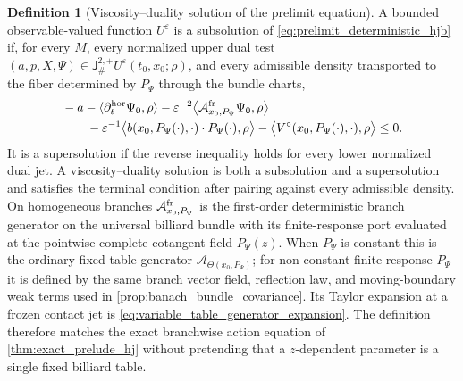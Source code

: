 \documentclass[12pt, letterpaper]{amsart}
\newcommand{\Acal}{\mathcal{A}}
\newcommand{\Hor}{\mathrm{hor}}
\newcommand{\Jet}{\mathsf{J}}
\theoremstyle{plain}
\theoremstyle{definition}
\newtheorem{definition}[theorem]{Definition}
\theoremstyle{remark}
\begin{document}
\begin{definition}[Viscosity--duality solution of the prelimit equation]
\label{def:viscosity_duality_solution}
A bounded observable-valued function $U^\varepsilon$ is a subsolution of
\eqref{eq:prelimit_deterministic_hjb} if, for every $M$, every normalized upper
dual test $(a,p,X,\Psi)\in\Jet^{2,+}_\#U^\varepsilon(t_0,x_0;\rho)$, and every
admissible density transported to the fiber determined by
$P_\Psi$ through the bundle charts,
\begin{equation}
\label{eq:viscodual_subsolution}
\begin{split}
    &-a-\langle\partial_t^{\Hor}\Psi_0,\rho\rangle
    -\varepsilon^{-2}\big\langle
        \Acal^{\rm fr}_{x_0,P_\Psi}\Psi_0,\rho\big\rangle\\
    &\qquad
    -\varepsilon^{-1}\big\langle
        b(x_0,P_\Psi(\cdot),\cdot)\cdot P_\Psi(\cdot),\rho\big\rangle
    -\big\langle V^\circ(x_0,P_\Psi(\cdot),\cdot),\rho\big\rangle\le0.
\end{split}
\end{equation}
It is a supersolution if the reverse inequality holds for every lower normalized
dual jet.  A viscosity--duality solution is both a subsolution and a
supersolution and satisfies the terminal condition after pairing against every
admissible density.  On homogeneous branches
$\Acal^{\rm fr}_{x_0,P_\Psi}$ is the first-order deterministic branch generator
on the universal billiard bundle with its finite-response port evaluated at the
pointwise complete cotangent field $P_\Psi(z)$.  When $P_\Psi$ is constant this
is the ordinary fixed-table generator $\Acal_{\Theta(x_0,P_\Psi)}$; for
non-constant finite-response $P_\Psi$ it is defined by the same branch vector
field, reflection law, and moving-boundary weak terms used in
\cref{prop:banach_bundle_covariance}.  Its Taylor expansion at a frozen contact
jet is \eqref{eq:variable_table_generator_expansion}.  The definition therefore
matches the exact branchwise action equation of \cref{thm:exact_prelude_hj}
without pretending that a $z$-dependent parameter is a single fixed billiard
table.
\end{definition}
\end{document}
